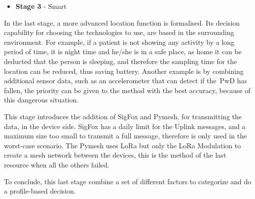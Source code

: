 \newpage
\begin{itemize}
\item \textbf{Stage 3} - Smart 
\end{itemize}

In the last stage, a more advanced location function is formalised. Its decision capability for choosing the technologies to use, are based in the surrounding environment. For example, if a patient is not showing any activity by a long period of time, it is night time and he/she is in a safe place, as home it can be deducted that the person is sleeping, and therefore the sampling time for the location can be reduced, thus saving battery.
Another example is by combining additional
sensor data, such as  an accelerometer that can detect if the~\gls{PwD} has fallen, the priority can be given to the method with the best accuracy, because of this dangerous situation.

This stage introduces the addition of SigFox and Pymesh, for transmitting the data, in the device side. SigFox has a daily limit for the Uplink messages, and a maximum size too small to transmit a full message, therefore is only used in the worst-case scenario. The Pymesh uses LoRa but only the LoRa Modulation to create a mesh network between the devices, this is the method of the last resource when all the others failed.

To conclude, this last stage combine a set of different
factors to categorize and do a profile-based decision.

